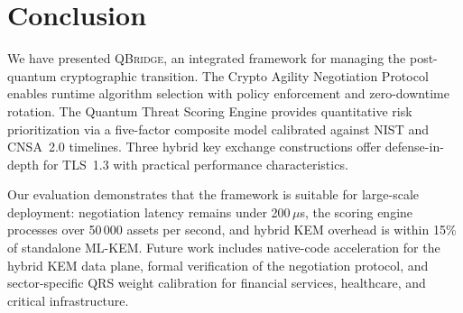 \documentclass[conference,10pt]{IEEEtran}
\newcommand{\system}{\textsc{QBridge}}
\begin{document}
\section{Conclusion}\label{sec:conclusion}

We have presented \system{}, an integrated framework for managing the
post-quantum cryptographic transition. The Crypto Agility Negotiation
Protocol enables runtime algorithm selection with policy enforcement and
zero-downtime rotation. The Quantum Threat Scoring Engine provides
quantitative risk prioritization via a five-factor composite model
calibrated against NIST and CNSA~2.0 timelines. Three hybrid key exchange
constructions offer defense-in-depth for TLS~1.3 with practical
performance characteristics.

Our evaluation demonstrates that the framework is suitable for
large-scale deployment: negotiation latency remains under 200\,$\mu$s,
the scoring engine processes over 50\,000 assets per second, and hybrid
KEM overhead is within 15\% of standalone ML-KEM. Future work includes
native-code acceleration for the hybrid KEM data plane, formal
verification of the negotiation protocol, and sector-specific QRS
weight calibration for financial services, healthcare, and critical
infrastructure.

\balance


\end{document}
